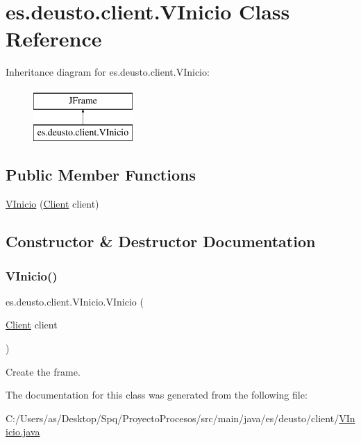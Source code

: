 \hypertarget{classes_1_1deusto_1_1client_1_1_v_inicio}{}\section{es.\+deusto.\+client.\+V\+Inicio Class Reference}
\label{classes_1_1deusto_1_1client_1_1_v_inicio}
Inheritance diagram for es.\+deusto.\+client.\+V\+Inicio\+:\begin{figure}[H]
\begin{center}
\leavevmode
\includegraphics[height=2.000000cm]{classes_1_1deusto_1_1client_1_1_v_inicio}
\end{center}
\end{figure}
\subsection*{Public Member Functions}
\begin{DoxyCompactItemize}
\item 
\mbox{\hyperlink{classes_1_1deusto_1_1client_1_1_v_inicio_afdd2ccc8ad54910cb71c90cd1e546bb7}{V\+Inicio}} (\mbox{\hyperlink{classes_1_1deusto_1_1client_1_1_client}{Client}} client)
\end{DoxyCompactItemize}


\subsection{Constructor \& Destructor Documentation}
\mbox{\label{classes_1_1deusto_1_1client_1_1_v_inicio_afdd2ccc8ad54910cb71c90cd1e546bb7}} 
\subsubsection{\texorpdfstring{VInicio()}{VInicio()}}
{\footnotesize\ttfamily es.\+deusto.\+client.\+V\+Inicio.\+V\+Inicio (\begin{DoxyParamCaption}\item[{\mbox{\hyperlink{classes_1_1deusto_1_1client_1_1_client}{Client}}}]{client }\end{DoxyParamCaption})}

Create the frame. 

The documentation for this class was generated from the following file\+:\begin{DoxyCompactItemize}
\item 
C\+:/\+Users/as/\+Desktop/\+Spq/\+Proyecto\+Procesos/src/main/java/es/deusto/client/\mbox{\hyperlink{_v_inicio_8java}{V\+Inicio.\+java}}\end{DoxyCompactItemize}

